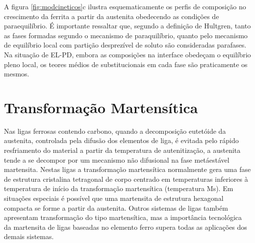 A figura \ref{fig:modcineticos}c ilustra esquematicamente os perfis de composição no crescimento da ferrita a partir da austenita obedecendo as condições de paraequilíbrio. É importante ressaltar que, segundo a definição de Hultgren, tanto as fases formadas segundo o mecanismo de paraquilíbrio, quanto pelo mecanismo de equilíbrio local com partição desprezível de soluto são consideradas parafases. Na situação de EL-PD, embora as composições na interface obedeçam o equilíbrio pleno local, os teores médios de substitucionais em cada fase são praticamente os mesmos\cite{Hillert2004a}.


\section{Transforma\c{c}\~{a}o Martens\'{i}tica}

\label{sec:Martensita}

Nas ligas ferrosas contendo carbono, quando a decomposição eutetóide da austenita, controlada pela difusão dos elementos de liga, é evitada pelo rápido resfriamento do material a partir da temperatura de autenitização, a austenita tende a se decompor por um mecanismo não difusional na fase metáestável martensita. Nestas ligas a transformação martensítica normalmente gera uma fase de estrutura cristalina tetragonal de corpo centrado em temperaturas inferiores à temperatura de início da transformação martensítica (temperatura Ms). Em situações especiais é possível que uma martensita de estrutura hexagonal compacta se forme a partir da austenita. Outros sistemas de ligas também apresentam transformação do tipo martensítica, mas a importância tecnológica da martensita de ligas baseadas no elemento ferro supera todas as aplicações dos demais sistemas.


